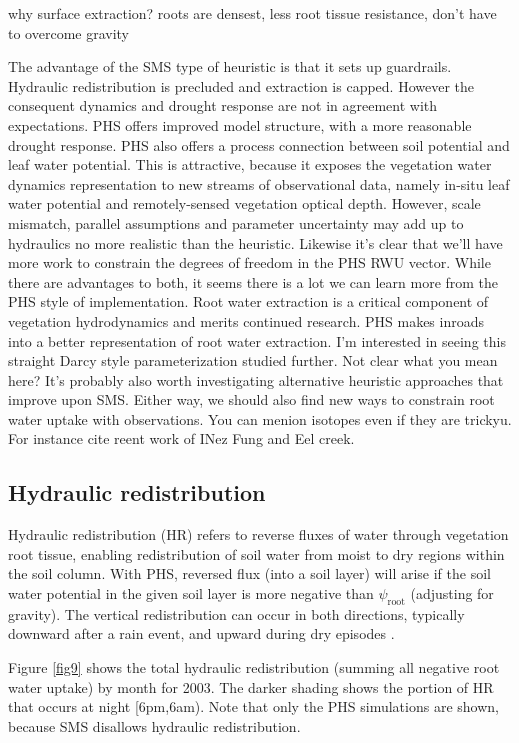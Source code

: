 \documentclass[draft,linenumbers]{agujournal}
\begin{document}
why surface extraction?
roots are densest, less root tissue resistance, don't have to overcome gravity

The advantage of the SMS type of heuristic is that it sets up guardrails.
Hydraulic redistribution is precluded and extraction is capped.
However the consequent dynamics and drought response are not in agreement with expectations.
PHS offers improved model structure, with a more reasonable drought response.
PHS also offers a process connection between soil potential and leaf water potential.
This is attractive, because it exposes the vegetation water dynamics representation to new streams of observational data, 
namely in-situ leaf water potential and remotely-sensed vegetation optical depth.
However, scale mismatch, parallel assumptions and parameter uncertainty may add up to hydraulics no more realistic than the heuristic.
Likewise it's clear that we'll have more work to constrain the degrees of freedom in the PHS RWU vector.
While there are advantages to both, it seems there is a lot we can learn more from the PHS style of implementation.
Root water extraction is a critical component of vegetation hydrodynamics and merits continued research.
PHS makes inroads into a better representation of root water extraction.
I'm interested in seeing this straight Darcy style parameterization studied further. Not clear what you mean here? 
It's probably also worth investigating alternative heuristic approaches that improve upon SMS.
Either way, we should also find new ways to constrain root water uptake with observations. You can menion isotopes even if they are trickyu. For instance cite reent work of INez Fung and Eel creek.


\subsection{Hydraulic redistribution}

Hydraulic redistribution (HR) refers to reverse fluxes of water through vegetation root tissue, enabling redistribution of soil water from moist to dry regions within the soil column.
With PHS, reversed flux (into a soil layer) will arise if the soil water potential in the given soil layer is more negative than $\psi_{\text{root}}$ (adjusting for gravity).
The vertical redistribution can occur in both directions, typically downward after a rain event, and upward during dry episodes \citep{burgess1998}.

Figure \ref{fig9} shows the total hydraulic redistribution (summing all negative root water uptake) by month for 2003. 
The darker shading shows the portion of HR that occurs at night [6pm,6am). 
Note that only the PHS simulations are shown, because SMS disallows hydraulic redistribution.
\end{document}
